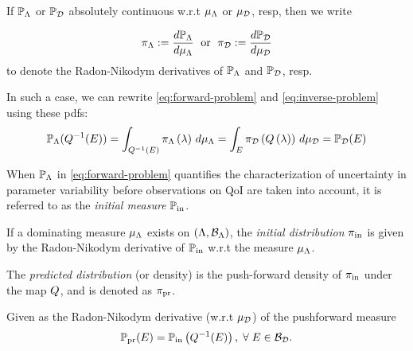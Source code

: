 \begin{frame}

\begin{defn}\label{defn:consistent-solution}
  If $\mathbb{P}_{\Lambda}$ or $\mathbb{P}_{\mathcal{D}}$ absolutely continuous w.r.t $\mu_{{\Lambda}}$ or $\mu_{\mathcal{D}}$, resp, then we write

  \begin{equation*}
    \pi_{\Lambda} := \frac{d\mathbb{P}_{\Lambda}}{d\mu_{{\Lambda}}} \;\text{ or }\; \pi_{\mathcal{D}} := \frac{d\mathbb{P}_{\mathcal{D}}}{d\mu_{\mathcal{D}}}
  \end{equation*}
  to denote the Radon-Nikodym derivatives of $\mathbb{P}_{\Lambda}$ and $\mathbb{P}_{\mathcal{D}}$, resp.
  \bigskip

  In such a case, we can rewrite \eqref{eq:forward-problem} and \eqref{eq:inverse-problem} using these pdfs:
  \begin{equation*}
  \mathbb{P}_{\Lambda} (Q^{-1}(E)) = \int_{Q^{-1}(E)} \pi_{\Lambda} \left ( \lambda \right ) \, d\mu_{{\Lambda}} = \int_E \pi_{\mathcal{D}} \left ( Q\left ( \lambda \right ) \right ) \, d\mu_{\mathcal{D}} = \mathbb{P}_{\mathcal{D}}(E)
  \end{equation*}

\end{defn}

\end{frame}


\begin{frame}

\begin{defn}\label{defn:initial}
  When $\mathbb{P}_{\Lambda}$ in \eqref{eq:forward-problem} quantifies the characterization of uncertainty in parameter variability before observations on QoI are taken into account, it is referred to as the \emph{initial measure} $\operatorname*{\mathbb{P}_{in}}$.

  If a dominating measure $\mu_{\Lambda}$ exists on $({\Lambda}, \mathcal{B}_{{\Lambda}})$, the \emph{initial distribution} $\operatorname*{\pi_{in}}$ is given by the Radon-Nikodym derivative of $\operatorname*{\mathbb{P}_{in}}$ w.r.t the measure $\mu_{{\Lambda}}$.
\end{defn}

\end{frame}


\begin{frame}
\begin{defn}\label{defn:predicted}
 The \emph{predicted distribution} (or density) is the push-forward density of $\operatorname*{\pi_{in}}$ under the map $Q$, and is denoted as $\operatorname*{\pi_{pr}}$.

  Given as the Radon-Nikodym derivative (w.r.t $\mu_{\mathcal{D}}$) of the pushforward measure
 \begin{equation}\label{eq:predicted}
    \operatorname*{\mathbb{P}_{pr}} (E) = \operatorname*{\mathbb{P}_{in}} \left ( Q^{-1}(E) \right ), \; \forall \; E \in \mathcal{B}_{\mathcal{D}}.
  \end{equation}
\end{defn}


\end{frame}


